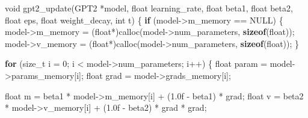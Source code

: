\documentclass[
  letterpaper,
  DIV=11,
  numbers=noendperiod]{scrreprt}
\newenvironment{Shaded}{\begin{snugshade}}{\end{snugshade}}
\newcommand{\BuiltInTok}[1]{\textcolor[rgb]{0.00,0.23,0.31}{#1}}
\newcommand{\ControlFlowTok}[1]{\textcolor[rgb]{0.00,0.23,0.31}{\textbf{#1}}}
\newcommand{\DataTypeTok}[1]{\textcolor[rgb]{0.68,0.00,0.00}{#1}}
\newcommand{\DecValTok}[1]{\textcolor[rgb]{0.68,0.00,0.00}{#1}}
\newcommand{\FloatTok}[1]{\textcolor[rgb]{0.68,0.00,0.00}{#1}}
\newcommand{\KeywordTok}[1]{\textcolor[rgb]{0.00,0.23,0.31}{\textbf{#1}}}
\newcommand{\NormalTok}[1]{\textcolor[rgb]{0.00,0.23,0.31}{#1}}
\newcommand{\OperatorTok}[1]{\textcolor[rgb]{0.37,0.37,0.37}{#1}}
\begin{document}
\begin{Shaded}
\begin{Highlighting}[]
\DataTypeTok{void}\NormalTok{ gpt2\_update}\OperatorTok{(}\NormalTok{GPT2 }\OperatorTok{*}\NormalTok{model}\OperatorTok{,} \DataTypeTok{float}\NormalTok{ learning\_rate}\OperatorTok{,} \DataTypeTok{float}\NormalTok{ beta1}\OperatorTok{,} \DataTypeTok{float}\NormalTok{ beta2}\OperatorTok{,}
                 \DataTypeTok{float}\NormalTok{ eps}\OperatorTok{,} \DataTypeTok{float}\NormalTok{ weight\_decay}\OperatorTok{,} \DataTypeTok{int}\NormalTok{ t}\OperatorTok{)} \OperatorTok{\{}
    \ControlFlowTok{if} \OperatorTok{(}\NormalTok{model}\OperatorTok{{-}\textgreater{}}\NormalTok{m\_memory }\OperatorTok{==}\NormalTok{ NULL}\OperatorTok{)} \OperatorTok{\{}
\NormalTok{        model}\OperatorTok{{-}\textgreater{}}\NormalTok{m\_memory }\OperatorTok{=} \OperatorTok{(}\DataTypeTok{float}\OperatorTok{*)}\NormalTok{calloc}\OperatorTok{(}\NormalTok{model}\OperatorTok{{-}\textgreater{}}\NormalTok{num\_parameters}\OperatorTok{,} \KeywordTok{sizeof}\OperatorTok{(}\DataTypeTok{float}\OperatorTok{));}
\NormalTok{        model}\OperatorTok{{-}\textgreater{}}\NormalTok{v\_memory }\OperatorTok{=} \OperatorTok{(}\DataTypeTok{float}\OperatorTok{*)}\NormalTok{calloc}\OperatorTok{(}\NormalTok{model}\OperatorTok{{-}\textgreater{}}\NormalTok{num\_parameters}\OperatorTok{,} \KeywordTok{sizeof}\OperatorTok{(}\DataTypeTok{float}\OperatorTok{));}
    \OperatorTok{\}}

    \ControlFlowTok{for} \OperatorTok{(}\DataTypeTok{size\_t}\NormalTok{ i }\OperatorTok{=} \DecValTok{0}\OperatorTok{;}\NormalTok{ i }\OperatorTok{\textless{}}\NormalTok{ model}\OperatorTok{{-}\textgreater{}}\NormalTok{num\_parameters}\OperatorTok{;}\NormalTok{ i}\OperatorTok{++)} \OperatorTok{\{}
        \DataTypeTok{float}\NormalTok{ param }\OperatorTok{=}\NormalTok{ model}\OperatorTok{{-}\textgreater{}}\NormalTok{params\_memory}\OperatorTok{[}\NormalTok{i}\OperatorTok{];}
        \DataTypeTok{float}\NormalTok{ grad }\OperatorTok{=}\NormalTok{ model}\OperatorTok{{-}\textgreater{}}\NormalTok{grads\_memory}\OperatorTok{[}\NormalTok{i}\OperatorTok{];}

        \DataTypeTok{float}\NormalTok{ m }\OperatorTok{=}\NormalTok{ beta1 }\OperatorTok{*}\NormalTok{ model}\OperatorTok{{-}\textgreater{}}\NormalTok{m\_memory}\OperatorTok{[}\NormalTok{i}\OperatorTok{]} \OperatorTok{+} \OperatorTok{(}\FloatTok{1.0}\BuiltInTok{f} \OperatorTok{{-}}\NormalTok{ beta1}\OperatorTok{)} \OperatorTok{*}\NormalTok{ grad}\OperatorTok{;}
        \DataTypeTok{float}\NormalTok{ v }\OperatorTok{=}\NormalTok{ beta2 }\OperatorTok{*}\NormalTok{ model}\OperatorTok{{-}\textgreater{}}\NormalTok{v\_memory}\OperatorTok{[}\NormalTok{i}\OperatorTok{]} \OperatorTok{+} \OperatorTok{(}\FloatTok{1.0}\BuiltInTok{f} \OperatorTok{{-}}\NormalTok{ beta2}\OperatorTok{)} \OperatorTok{*}\NormalTok{ grad }\OperatorTok{*}\NormalTok{ grad}\OperatorTok{;}


\end{Highlighting}
\end{Shaded}
\end{document}
